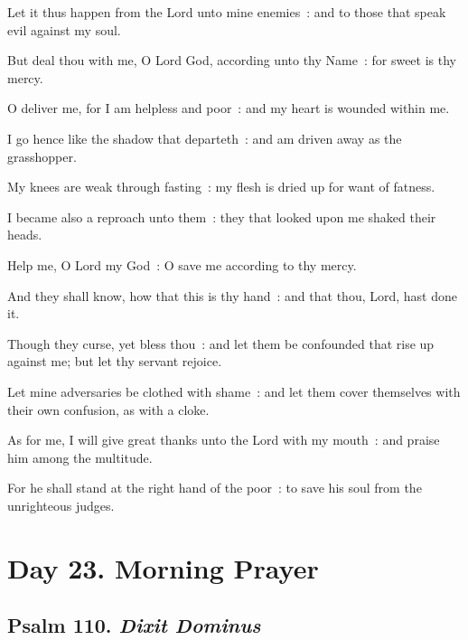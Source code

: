 Let it thus happen from the Lord unto mine enemies~: and to those that speak evil against my soul.\par
{}But deal thou with me, O Lord God, according unto thy Name~: for sweet is thy mercy.\par
{}O deliver me, for I am helpless and poor~: and my heart is wounded within me.\par
{}I go hence like the shadow that departeth~: and am driven away as the grasshopper.\par
{}My knees are weak through fasting~: my flesh is dried up for want of fatness.\par
{}I became also a reproach unto them~: they that looked upon me shaked their heads.\par
{}Help me, O Lord my God~: O save me according to thy mercy.\par
{}And they shall know, how that this is thy hand~: and that thou, Lord, hast done it.\par
{}Though they curse, yet bless thou~: and let them be confounded that rise up against me; but let thy servant rejoice.\par
{}Let mine adversaries be clothed with shame~: and let them cover themselves with their own confusion, as with a cloke.\par
{}As for me, I will give great thanks unto the Lord with my mouth~: and praise him among the multitude.\par
{}For he shall stand at the right hand of the poor~: to save his soul from the unrighteous judges.\par

\section*{Day 23. Morning Prayer}

\subsection{Psalm 110. \textit{Dixit Dominus}}


